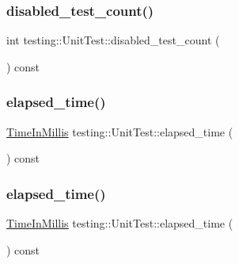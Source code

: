 \mbox{\label{classtesting_1_1_unit_test_ad69ccf3d4a9bc7333badeafbde3bc76b}} 
\subsubsection{\texorpdfstring{disabled\_test\_count()}{disabled\_test\_count()}\hspace{0.1cm}{\footnotesize\ttfamily [3/3]}}
{\footnotesize\ttfamily int testing\+::\+Unit\+Test\+::disabled\+\_\+test\+\_\+count (\begin{DoxyParamCaption}{ }\end{DoxyParamCaption}) const}

\mbox{\label{classtesting_1_1_unit_test_a410e14e52f505dabe2054e5018e9ca33}} 
\subsubsection{\texorpdfstring{elapsed\_time()}{elapsed\_time()}\hspace{0.1cm}{\footnotesize\ttfamily [1/3]}}
{\footnotesize\ttfamily \mbox{\hyperlink{namespacetesting_a992de1d091ce660f451d1e8b3ce30fd6}{Time\+In\+Millis}} testing\+::\+Unit\+Test\+::elapsed\+\_\+time (\begin{DoxyParamCaption}{ }\end{DoxyParamCaption}) const}

\mbox{\label{classtesting_1_1_unit_test_a410e14e52f505dabe2054e5018e9ca33}} 
\subsubsection{\texorpdfstring{elapsed\_time()}{elapsed\_time()}\hspace{0.1cm}{\footnotesize\ttfamily [2/3]}}
{\footnotesize\ttfamily \mbox{\hyperlink{namespacetesting_a992de1d091ce660f451d1e8b3ce30fd6}{Time\+In\+Millis}} testing\+::\+Unit\+Test\+::elapsed\+\_\+time (\begin{DoxyParamCaption}{ }\end{DoxyParamCaption}) const}

